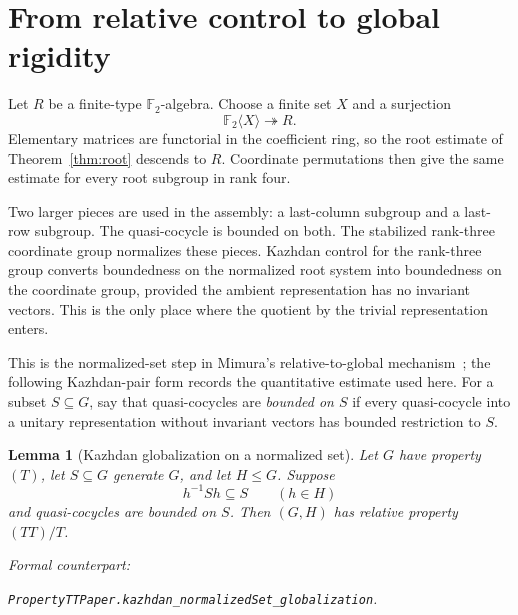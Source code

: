 \documentclass[11pt]{amsart}
\newif\ifanonymous\anonymoustrue
\newcommand{\leanrepo}{[repository link removed for anonymous review]}
\newcommand{\leanrepo}{https://github.com/SauersML/group-approximation}
\newcommand{\leanverified}[2]{%
  \par\smallskip\noindent
  {\normalfont\footnotesize\color{gray!70!black}%
  Formal counterpart:\par\nobreak\noindent
  \ifanonymous\nolinkurl{#2}\else
  \href{\leanrepo/blob/main/GroupApproximation/#1.lean}{\nolinkurl{#2}}\fi.}}
\newtheorem{lemma}[theorem]{Lemma}
\theoremstyle{definition}
\theoremstyle{plain}
\newcommand{\F}{\mathbb F}
\begin{document}
\section{From relative control to global rigidity}\label{sec:globalization}

Let \(R\) be a finite-type \(\F_2\)-algebra.  Choose a finite set
\(X\) and a surjection
\[
  \F_2\langle X\rangle\twoheadrightarrow R.
\]
Elementary matrices are functorial in the coefficient ring, so the
root estimate of Theorem~\ref{thm:root} descends to \(R\).  Coordinate
permutations then give the same estimate for every root subgroup in
rank four.

Two larger pieces are used in the assembly: a last-column subgroup
and a last-row subgroup.  The quasi-cocycle is bounded on both.
The stabilized rank-three coordinate group normalizes these pieces.
Kazhdan control for the rank-three group converts boundedness on the
normalized root system into boundedness on the coordinate group,
provided the ambient representation has no invariant vectors.  This
is the only place where the quotient by the trivial representation
enters.

This is the normalized-set step in Mimura's relative-to-global
mechanism~\cite[Theorem~5.1]{MimuraTT}; the following Kazhdan-pair
form records the quantitative estimate used here.  For a subset
\(S\subseteq G\), say that quasi-cocycles are \emph{bounded on
\(S\)} if every quasi-cocycle into a unitary representation without
invariant vectors has bounded restriction to \(S\).

\begin{lemma}[Kazhdan globalization on a normalized set]
\label{lem:kazhdan-globalization}
Let \(G\) have property~\((T)\), let \(S\subseteq G\) generate
\(G\), and let \(H\le G\).  Suppose
\[
  h^{-1}Sh\subseteq S\qquad(h\in H)
\]
and quasi-cocycles are bounded on \(S\).  Then \((G,H)\) has
relative property \((TT)/T\).
\leanverified{PropertyTT/PaperStatements}{PropertyTTPaper.kazhdan_normalizedSet_globalization}
\end{lemma}
\end{document}
